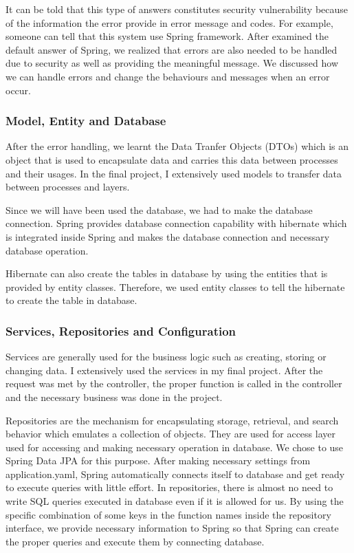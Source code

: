 It can be told that this type of answers constitutes security vulnerability because of the information the error provide in error message and codes. For example, someone can tell that this system use Spring framework. After examined the default answer of Spring, we realized that errors are also needed to be handled due to security as well as providing the meaningful message. We discussed how we can handle errors and change the behaviours and messages when an error occur.

\subsubsection{Model, Entity and Database}

After the error handling, we learnt the Data Tranfer Objects (DTOs) which is an object that is used to encapsulate data and carries this data between processes and their usages. In the final project, I extensively used models to transfer data between processes and layers.

Since we will have been used the database, we had to make the database connection. Spring provides database connection capability with hibernate which is integrated inside Spring and makes the database connection and necessary database operation. 

Hibernate can also create the tables in database by using the entities that is provided by entity classes. Therefore, we used entity classes to tell the hibernate to create the table in database.

\subsubsection{Services, Repositories and Configuration}

Services are generally used for the business logic such as creating, storing or changing data. I extensively used the services in my final project. After the request was met by the controller, the proper function is called in the controller and the necessary business was done in the project.

Repositories are the mechanism for encapsulating storage, retrieval, and search behavior which emulates a collection of objects. They are used for access layer used for accessing and making necessary operation in database. We chose to use Spring Data JPA for this purpose. After making necessary settings from application.yaml, Spring automatically connects itself to database and get ready to execute queries with little effort. In repositories, there is almost no need to write SQL queries executed in database even if it is allowed for us. By using the specific combination of some keys in the function names inside the repository interface, we provide necessary information to Spring so that Spring can create the proper queries and execute them by connecting database.

